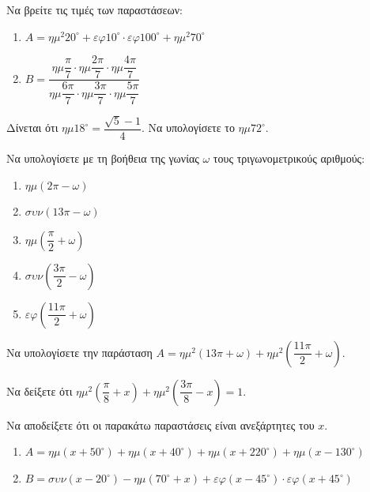 \documentclass{presentation}
\begin{document}
\begin{askisi}
  Να βρείτε τις τιμές των παραστάσεων:
  \begin{enumerate}
    \item $Α = ημ^2 20^\circ + εφ 10^\circ \cdot εφ 100^\circ + ημ^2 70^\circ$
    \item $Β = \dfrac{ημ \dfrac{π}{7} \cdot ημ \dfrac{2π}{7} \cdot ημ \dfrac{4π}{7}}{ημ \dfrac{6π}{7} \cdot ημ \dfrac{3π}{7} \cdot ημ \dfrac{5π}{7}}$
  \end{enumerate}
\end{askisi}

\begin{askisi}
  Δίνεται ότι $ημ 18^\circ = \dfrac{\sqrt{5} - 1}{4}$. Να υπολογίσετε το $ημ 72^\circ$.
\end{askisi}

\begin{askisi}
  Να υπολογίσετε με τη βοήθεια της γωνίας $ω$ τους τριγωνομετρικούς αριθμούς:
  \begin{enumerate}
    \item $ημ(2π - ω)$
    \item $συν(13π - ω)$
    \item $ημ\left(\dfrac{π}{2} + ω\right)$
    \item $συν\left(\dfrac{3π}{2} - ω\right)$
    \item $εφ\left(\dfrac{11π}{2} + ω\right)$
  \end{enumerate}
\end{askisi}

\begin{askisi}
  Να υπολογίσετε την παράσταση $Α = ημ^2(13π + ω) + ημ^2\left(\dfrac{11π}{2} + ω\right)$.
\end{askisi}

\begin{askisi}
  Να δείξετε ότι $ημ^2\left(\dfrac{π}{8} + x\right) + ημ^2\left(\dfrac{3π}{8} - x\right) = 1$.
\end{askisi}

\begin{askisi}
  Να αποδείξετε ότι οι παρακάτω παραστάσεις είναι ανεξάρτητες του $x$.
  \begin{enumerate}
    \item $Α = ημ(x + 50^\circ) + ημ(x + 40^\circ) + ημ(x + 220^\circ) + ημ(x - 130^\circ)$
    \item $Β = συν(x - 20^\circ) - ημ(70^\circ + x) + εφ(x - 45^\circ) \cdot εφ(x + 45^\circ)$
  \end{enumerate}
\end{askisi}
\end{document}
